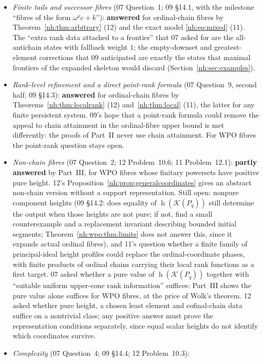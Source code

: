 \documentclass[11pt,a4paper]{article}
\theoremstyle{definition}
\theoremstyle{remark}
\newcommand{\K}{\mathcal K}
\newcommand{\hgt}{\operatorname{h}}
\begin{document}
\begin{itemize}
\item \emph{Finite tails and successor fibres} (07 Question~1; 09 \S14.1, with the
milestone ``fibres of the form $\omega^\rho c+k$''): \textbf{answered} for
ordinal-chain fibres by Theorem~\ref{nh:thm:arbitrary} (12) and the exact model
\eqref{nh:eq:mixed} (11). The ``extra rank data attached to a frontier'' that 07
asked for are the all-antichain states with fallback weight $1$; the empty-downset
and greatest-element corrections that 09 anticipated are exactly the states that
maximal frontiers of the expanded skeleton would discard
(Section~\ref{nh:sec:examples}).
\item \emph{Rank-level refinement and a direct point-rank formula} (07
Question~9, second half; 09 \S14.3): \textbf{answered} for ordinal-chain fibres by
Theorems~\ref{nh:thm:localrank} (12) and~\ref{nh:thm:local} (11), the latter for
any finite persistent system. 09's hope that a point-rank formula could remove the
appeal to chain attainment in the ordinal-fibre upper bound is met differently:
the proofs of Part~II never use chain attainment. For WPO fibres the point-rank
question stays open.
\item \emph{Non-chain fibres} (07 Question~2; 12 Problem~10.6; 11 Problem~12.1):
\textbf{partly answered} by Part~III, for WPO fibres whose finitary powersets have
positive pure height. 12's Proposition~\ref{nh:prop:generalcoordinates} gives an
abstract non-chain version without a support representation. Still open: nonpure
component heights (09 \S14.2: does equality of $\hgt(\K(P_q))$ still determine the
output when those heights are not pure; if not, find a small counterexample and a
replacement invariant describing bounded initial segments; Theorem~\ref{nh:wpo:thm:limits}
does not answer this, since it expands actual ordinal fibres), and 11's question
whether a finite family of principal-ideal height profiles could replace the
ordinal-coordinate phases, with finite products of ordinal chains carrying their
local rank functions as a first target. 07 asked whether a pure value of
$\hgt(\K(P_q))$ together with ``suitable uniform upper-cone rank information''
suffices: Part~III shows the pure value alone suffices for WPO fibres, at the price
of Wolk's theorem. 12 asked whether pure height, a chosen least element and
cofinal-chain data suffice on a nontrivial class; any positive answer must prove
the representation conditions separately, since equal scalar heights do not
identify which coordinates survive.
\item \emph{Complexity} (07 Question~4; 09 \S14.4; 12 Problem~10.3):

\end{itemize}
\end{document}
